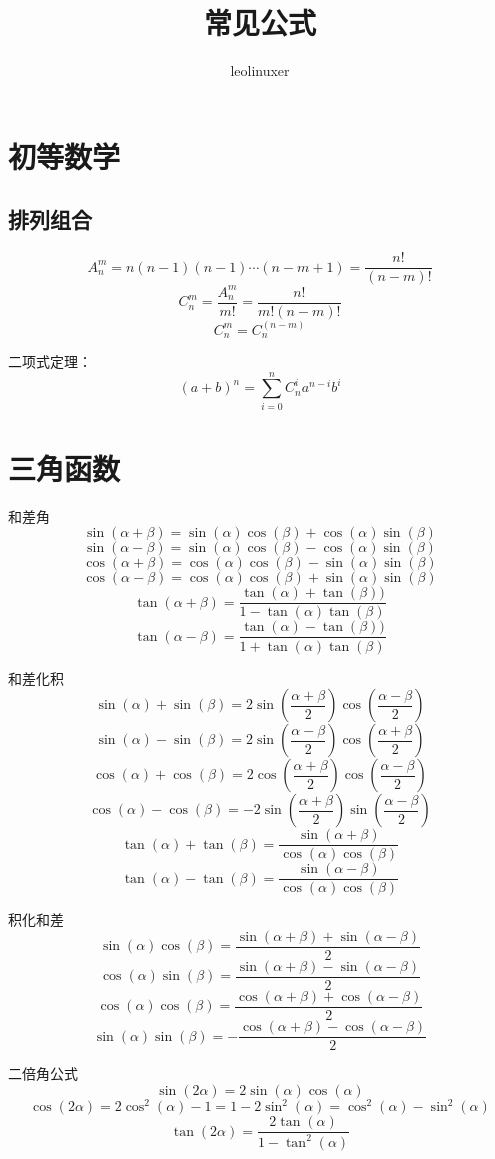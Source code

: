 \documentclass[12pt]{article}
\title{常见公式}
\author{leolinuxer}
\begin{document}
\maketitle

\section{初等数学}
\subsection{排列组合}
$$
A_n^m = n(n-1)(n-1) \cdots (n-m+1) = \frac{n!}{(n-m)!}
$$
$$
C_n^m = \frac{A_n^m}{m!} = \frac{n!}{m!(n-m)!}
$$
$$
C_n^m = C_n^(n-m)
$$

二项式定理：
$$
(a+b)^n = \sum_{i=0}^n{C_n^ia^{n-i}b^i}
$$

\section{三角函数}
和差角
$$
\sin(\alpha + \beta) = \sin(\alpha)\cos(\beta) + \cos(\alpha)\sin(\beta)
$$
$$
\sin(\alpha - \beta) = \sin(\alpha)\cos(\beta) - \cos(\alpha)\sin(\beta)
$$
$$
\cos(\alpha + \beta) = \cos(\alpha)\cos(\beta) - \sin(\alpha)\sin(\beta)
$$
$$
\cos(\alpha - \beta) = \cos(\alpha)\cos(\beta) + \sin(\alpha)\sin(\beta)
$$
$$
\tan(\alpha + \beta) = \frac{\tan(\alpha) + \tan(\beta))}{1 - \tan(\alpha)\tan(\beta)}
$$
$$
\tan(\alpha - \beta) = \frac{\tan(\alpha) - \tan(\beta))}{1 + \tan(\alpha)\tan(\beta)}
$$

和差化积
$$
\sin(\alpha) + \sin(\beta) = 2\sin(\frac{\alpha + \beta}{2})\cos(\frac{\alpha - \beta}{2})
$$
$$
\sin(\alpha) - \sin(\beta) = 2\sin(\frac{\alpha - \beta}{2})\cos(\frac{\alpha + \beta}{2})
$$
$$
\cos(\alpha) + \cos(\beta) = 2\cos(\frac{\alpha + \beta}{2})\cos(\frac{\alpha - \beta}{2})
$$
$$
\cos(\alpha) - \cos(\beta) = -2\sin(\frac{\alpha + \beta}{2})\sin(\frac{\alpha - \beta}{2})
$$
$$
\tan(\alpha) + \tan(\beta) = \frac{\sin(\alpha + \beta)}{\cos(\alpha)\cos(\beta)}
$$
$$
\tan(\alpha) - \tan(\beta) = \frac{\sin(\alpha - \beta)}{\cos(\alpha)\cos(\beta)}
$$

积化和差
$$
\sin(\alpha)\cos(\beta) = \frac{\sin(\alpha + \beta) + \sin(\alpha - \beta)}{2} 
$$
$$
\cos(\alpha)\sin(\beta) = \frac{\sin(\alpha + \beta) - \sin(\alpha - \beta)}{2} 
$$
$$
\cos(\alpha)\cos(\beta) = \frac{\cos(\alpha + \beta) + \cos(\alpha - \beta)}{2} 
$$
$$
\sin(\alpha)\sin(\beta) = -\frac{\cos(\alpha + \beta) - \cos(\alpha - \beta)}{2} 
$$

二倍角公式
$$
\sin(2\alpha) = 2\sin(\alpha)\cos(\alpha)
$$
$$
\cos(2\alpha) = 2\cos^2(\alpha) - 1 = 1 - 2\sin^2(\alpha) = \cos^2(\alpha) - \sin^2(\alpha)
$$
$$
\tan(2\alpha) = \frac{2\tan(\alpha)}{1 - \tan^2(\alpha)}
$$
\end{document}
